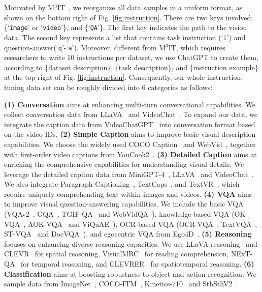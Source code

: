 Motivated by M$^3$IT~\cite{m3it},
we reorganize all data samples in a uniform format, as shown on the bottom right of Fig. \ref{fig:instruction}. 
There are two keys involved: \{`\texttt{image}' or `\texttt{video}'\}, and \{`\texttt{QA}'\}.
The first key indicates the path to the vision data.
The second key represents a list that contains task instruction (`\texttt{i}') and question-answer(`\texttt{q}'-`\texttt{a}').
Moreover,
different from M$^3$IT, 
which requires researchers to write 10 instructions per dataset, 
we use ChatGPT to create them, 
according to \{dataset description\}, \{task description\}, and \{instruction example\} at the top right of Fig. \ref{fig:instruction}.
Consequently,
our whole instruction-tuning data set can be roughly divided into 6 categories as follows:

\textbf{(1) Conversation} 
aims at enhancing multi-turn conversational capabilities. 
We collect conversation data from LLaVA~\cite{llava} and VideoChat~\cite{videochat}.
To expand our data, 
we integrate the caption data from VideoChatGPT~\cite{videochatgpt} into conversation format based on the video IDs.
\textbf{(2) Simple Caption}
aims to improve basic visual description capabilities.
We choose the widely used COCO Caption~\cite{coco} and WebVid~\cite{bain2021frozen},
together with first-order video captions from YouCook2~\cite{youcook2}.
\textbf{(3) Detailed Caption}
aims at enriching the comprehensive capabilities for understanding visual details.
We leverage the detailed caption data from 
MiniGPT-4~\cite{minigpt4}, 
LLaVA~\cite{llava} and VideoChat~\cite{videochat}.
We also integrate Paragraph Captioning~\cite{paragraphs},
TextCaps~\cite{textcaps},
and TextVR~\cite{textvr},
which require uniquely comprehending text within images and videos.
\textbf{(4) VQA} aims to improve visual question-answering capabilities.
We include the basic VQA (VQAv2~\cite{vqa}, GQA~\cite{gqa}, TGIF-QA~\cite{tgif_qa} and WebVidQA~\cite{just_ask}), 
knowledge-based VQA (OK-VQA~\cite{okvqa}, AOK-VQA~\cite{aokvqa} and ViQuAE~\cite{viquae}), 
OCR-based VQA (OCR-VQA~\cite{ocr_vqa}, TextVQA~\cite{textvqa}, ST-VQA~\cite{st_vqa} and DocVQA~\cite{docvqa}), 
and egocentric VQA from Ego4D~\cite{ego4d}.
\textbf{(5) Reasoning} focuses on enhancing diverse reasoning capacities.
We use 
LLaVA-reasoning~\cite{llava} and CLEVR~\cite{clevr} for spatial reasoning, 
VisualMRC~\cite{visualmrc} for reading comprehension, 
NExT-QA~\cite{nextqa} for temporal reasoning, 
and CLEVRER~\cite{clevrer} for spatiotemporal reasoning.
\textbf{(6) Classification} aims at boosting robustness to object and action recognition.
We sample data from ImageNet~\cite{imagenet}, COCO-ITM~\cite{coco}, Kinetics-710~\cite{uniformerv2} and SthSthV2~\cite{sth}. 


